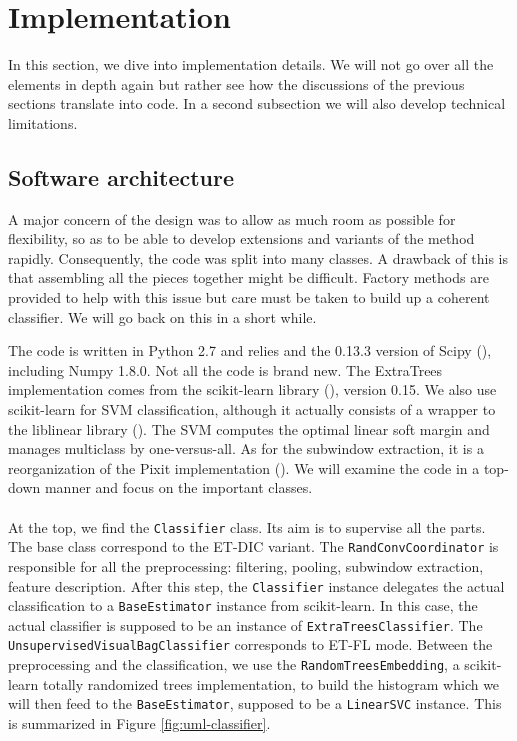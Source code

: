 \documentclass[a4paper]{report}
\begin{document}
	
	\section{Implementation}
	
	In this section, we dive into implementation details. We will not go over all the elements in depth again but rather see how the discussions of the previous sections translate into code. In a second subsection we will also develop technical limitations.
		\subsection{Software architecture}
		A major concern of the design was to allow as much room as possible for flexibility, so as to be able to develop extensions and variants of the method rapidly. Consequently, the code was split into many classes. A drawback of this is that assembling all the pieces together might be difficult. Factory methods are provided to help with this issue but care must be taken to build up a coherent classifier. We will go back on this in a short while. 
		\par
		The code is written in Python 2.7 and relies and the 0.13.3 version of Scipy (\cite{scipy}), including Numpy 1.8.0. Not all the code is brand new. The ExtraTrees implementation comes from the scikit-learn library (\cite{sklearn}), version 0.15. We also use scikit-learn for SVM classification, although it actually consists of a wrapper to the liblinear library (\cite{liblinear}). The SVM computes the optimal linear soft margin and manages multiclass by one-versus-all.
				As for the subwindow extraction, it is a reorganization of the Pixit implementation (\cite{cytomine}).
		We will examine the code in a top-down manner and focus on the important classes.
		\paragraph{}
		At the top, we find the \texttt{Classifier} class. Its aim is to supervise all the parts. The base class correspond to the ET-DIC variant. The \texttt{RandConvCoordinator} is responsible for all the preprocessing: filtering, pooling, subwindow extraction, feature description. After this step, the \texttt{Classifier} instance delegates the actual classification to a \texttt{BaseEstimator} instance from scikit-learn. In this case, the actual classifier is supposed to be an instance of \texttt{ExtraTreesClassifier}. The \texttt{UnsupervisedVisualBagClassifier} corresponds to ET-FL mode. Between the preprocessing and the classification, we use the \texttt{RandomTreesEmbedding}, a scikit-learn totally randomized trees implementation, to build the histogram which we will then feed to the \texttt{BaseEstimator}, supposed to be a \texttt{LinearSVC} instance.
		This is summarized in Figure \ref{fig:uml-classifier}.
		
\end{document}
